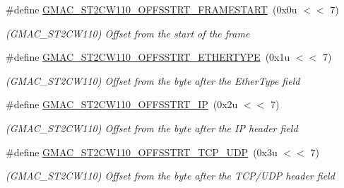 \begin{DoxyCompactItemize}
\item 
\mbox{\label{group__SAME70__GMAC_gac52a8f82174d3fdf82217b9f07a76d2c}} 
\#define \mbox{\hyperlink{group__SAME70__GMAC_gac52a8f82174d3fdf82217b9f07a76d2c}{G\+M\+A\+C\+\_\+\+S\+T2\+C\+W110\+\_\+\+O\+F\+F\+S\+S\+T\+R\+T\+\_\+\+F\+R\+A\+M\+E\+S\+T\+A\+RT}}~(0x0u $<$$<$ 7)
\begin{DoxyCompactList}\small\item\em (G\+M\+A\+C\+\_\+\+S\+T2\+C\+W110) Offset from the start of the frame \end{DoxyCompactList}\item 
\mbox{\label{group__SAME70__GMAC_gaa90c687911d45b379c7b15cda1eb62db}} 
\#define \mbox{\hyperlink{group__SAME70__GMAC_gaa90c687911d45b379c7b15cda1eb62db}{G\+M\+A\+C\+\_\+\+S\+T2\+C\+W110\+\_\+\+O\+F\+F\+S\+S\+T\+R\+T\+\_\+\+E\+T\+H\+E\+R\+T\+Y\+PE}}~(0x1u $<$$<$ 7)
\begin{DoxyCompactList}\small\item\em (G\+M\+A\+C\+\_\+\+S\+T2\+C\+W110) Offset from the byte after the Ether\+Type field \end{DoxyCompactList}\item 
\mbox{\label{group__SAME70__GMAC_gaa65a1dac267299505f62a0d4498c09d4}} 
\#define \mbox{\hyperlink{group__SAME70__GMAC_gaa65a1dac267299505f62a0d4498c09d4}{G\+M\+A\+C\+\_\+\+S\+T2\+C\+W110\+\_\+\+O\+F\+F\+S\+S\+T\+R\+T\+\_\+\+IP}}~(0x2u $<$$<$ 7)
\begin{DoxyCompactList}\small\item\em (G\+M\+A\+C\+\_\+\+S\+T2\+C\+W110) Offset from the byte after the IP header field \end{DoxyCompactList}\item 
\mbox{\label{group__SAME70__GMAC_ga84b15ba8b81892462e2576eb354532b2}} 
\#define \mbox{\hyperlink{group__SAME70__GMAC_ga84b15ba8b81892462e2576eb354532b2}{G\+M\+A\+C\+\_\+\+S\+T2\+C\+W110\+\_\+\+O\+F\+F\+S\+S\+T\+R\+T\+\_\+\+T\+C\+P\+\_\+\+U\+DP}}~(0x3u $<$$<$ 7)
\begin{DoxyCompactList}\small\item\em (G\+M\+A\+C\+\_\+\+S\+T2\+C\+W110) Offset from the byte after the T\+C\+P/\+U\+DP header field \end{DoxyCompactList}\item 
\mbox{\label{group__SAME70__GMAC_ga57dd3758d48f9cfc7ef84145bd6884de}} 

\end{DoxyCompactItemize}

